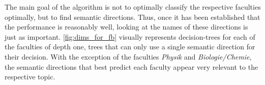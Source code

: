 The main goal of the algorithm is not to optimally classify the respective faculties optimally, but to find semantic directions. Thus, once it has been established that the performance is reasonably well, looking at the names of these directions is just as important. \autoref{fig:dims_for_fb} visually represents decision-trees for each of the faculties of depth one, \ie trees that can only use a single semantic direction for their decision. With the exception of the faculties \emph{Physik} and \emph{Biologie/Chemie}, the semantic directions that best predict each faculty appear very relevant to the respective topic.

\begin{figure}[h]
	\begin{center}
	\end{center}
\end{figure}

